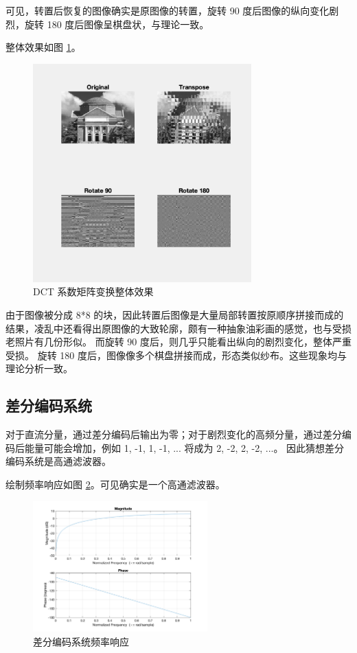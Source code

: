 \documentclass[a4paper]{article}  %
\begin{document}
可见，转置后恢复的图像确实是原图像的转置，旋转 90 度后图像的纵向变化剧烈，旋转 180 度后图像呈棋盘状，与理论一致。

整体效果如图 \ref{fig:2_4_image}。

\begin{figure}[ht]
    \centering
    \includegraphics[width=0.75\textwidth]{asserts/2_4_image.png}
    \caption{
        DCT 系数矩阵变换整体效果
    }\label{fig:2_4_image}
\end{figure}

由于图像被分成 8*8 的块，因此转置后图像是大量局部转置按原顺序拼接而成的结果，凌乱中还看得出原图像的大致轮廓，颇有一种抽象油彩画的感觉，也与受损老照片有几份形似。
而旋转 90 度后，则几乎只能看出纵向的剧烈变化，整体严重受损。
旋转 180 度后，图像像多个棋盘拼接而成，形态类似纱布。这些现象均与理论分析一致。

\subsection{差分编码系统}

对于直流分量，通过差分编码后输出为零；对于剧烈变化的高频分量，通过差分编码后能量可能会增加，例如 1, -1, 1, -1, ... 将成为 2, -2, 2, -2, ...。
因此猜想差分编码系统是高通滤波器。

绘制频率响应如图 \ref{fig:2_5_freq}。可见确实是一个高通滤波器。

\begin{figure}[ht]
    \centering
    \includegraphics[width=0.6\textwidth]{asserts/2_5_freqz.png}
    \caption{
        差分编码系统频率响应
    }\label{fig:2_5_freq}
\end{figure}
\end{document}
